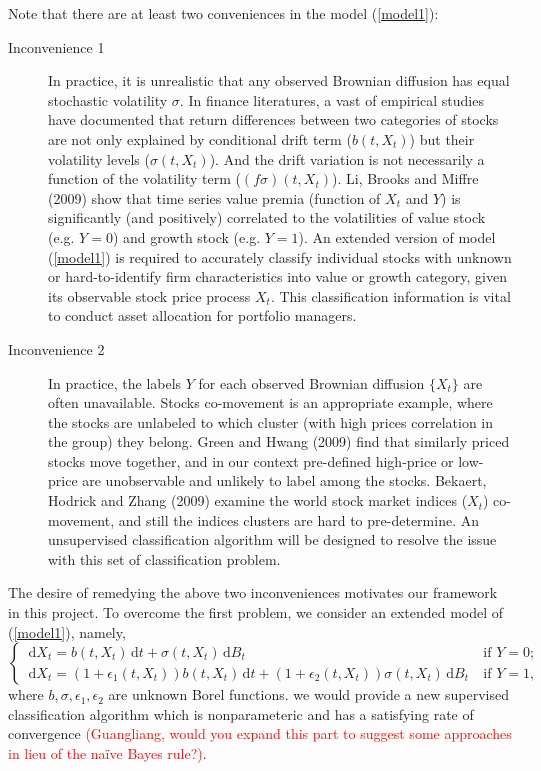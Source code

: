 \documentclass[9pt,a4paper]{article}
\def\ud{\, \mathrm{d}}
\begin{document}
  Note that there are at least two conveniences in the model (\ref{model1}):
  \begin{description}
  \item[Inconvenience 1] In practice, it is unrealistic that any observed Brownian diffusion has equal stochastic volatility $\sigma$. In finance literatures, a vast of empirical studies have documented that return differences between two categories of stocks are not only explained by conditional drift term ($b(t,X_t)$) but their volatility levels ($\sigma(t,X_t)$). And the drift variation is not necessarily a function of the volatility term ($(f\sigma)(t,X_t)$). Li, Brooks and Miffre (2009) show that time series value premia (function of $X_t$ and $Y$) is significantly (and positively) correlated to the volatilities of value stock (e.g. $Y=0$) and growth stock (e.g. $Y=1$). An extended version of model (\ref{model1}) is required to accurately classify individual stocks with unknown or hard-to-identify firm characteristics into value or growth category, given its observable stock price process $X_t$. This classification information is vital to conduct asset allocation for portfolio managers.
  \item[Inconvenience 2] In practice, the labels $Y$ for each observed Brownian diffusion $\{X_t\}$ are often unavailable. Stocks co-movement is an appropriate example, where the stocks are unlabeled to which cluster (with high prices correlation in the group) they belong. Green and Hwang (2009) find that similarly priced stocks move together, and in our context pre-defined high-price or low-price are unobservable and unlikely to label among the stocks. Bekaert, Hodrick and Zhang (2009) examine the world stock market indices ($X_t$) co-movement, and still the indices clusters are hard to pre-determine. An unsupervised classification algorithm will be designed to resolve the issue with this set of classification problem. 
  \end{description}
 The desire of remedying the above two inconveniences  motivates our framework in this project. To overcome the first problem, we consider an extended model of (\ref{model1}), namely,
   \begin{equation}
\label{model2}
\left\{
\begin{array}{ll}
\ud X_t= b(t,X_t)\ud t+\sigma(t,X_t)\ud B_t&~\mbox{if $Y=0$};\\
\ud X_t= (1+\epsilon_1(t,X_t))b(t,X_t)\ud t+(1+\epsilon_2(t,X_t))\sigma(t,X_t)\ud B_t&~\mbox{if $Y=1$},
\end{array}\right.
\end{equation}
where $b,\sigma,\epsilon_1,\epsilon_2$ are unknown Borel functions. we would provide a new supervised classification algorithm which is nonparameteric and has a satisfying rate of convergence \textcolor{red}{(Guangliang, would you expand this part to suggest some approaches in lieu of the na\"ive Bayes rule?)}.
\end{document}
